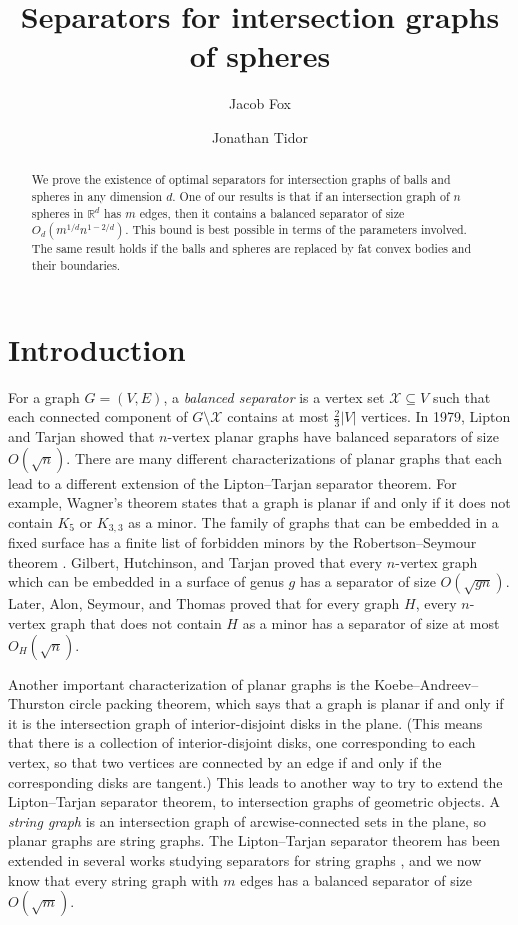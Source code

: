 \documentclass[11pt, reqno]{amsart}
\title{Separators for intersection graphs of spheres}
\author{Jacob Fox}
\author{Jonathan Tidor}
\date{}
\theoremstyle{plain}
\theoremstyle{definition}
\theoremstyle{remark}
\numberwithin{theorem}{section}
\numberwithin{equation}{section}
\newcommand{\R}{\mathbb R}
\newcommand{\fX}{\mathcal X}
\begin{document}
\begin{abstract}
We prove the existence of optimal separators for intersection graphs of balls and spheres in any dimension $d$. One of our results is that if an intersection graph of $n$ spheres in $\R^d$ has $m$ edges, then it contains a balanced separator of size $O_d(m^{1/d}n^{1-2/d})$. This bound is best possible in terms of the parameters involved. The same result holds if the balls and spheres are replaced by fat convex bodies and their boundaries.
\end{abstract}

\maketitle

\section{Introduction}
\label{sec:into}
For a graph $G=(V,E)$, a \emph{balanced separator} is a vertex set $\fX\subseteq V$ such that each connected component of $G\setminus \fX$ contains at most $\tfrac23|V|$ vertices. In 1979, Lipton and Tarjan \cite{LT79} showed that $n$-vertex planar graphs have balanced separators of size $O(\sqrt n)$. There are many different characterizations of planar graphs that each lead to a different extension of the Lipton--Tarjan separator theorem. For example, Wagner's theorem \cite{Wa37} states that a graph is planar if and only if it does not contain $K_5$ or $K_{3,3}$ as a minor. The family of graphs that can be embedded in a fixed surface has a finite list of forbidden minors by the Robertson--Seymour theorem \cite{RS04}. Gilbert, Hutchinson, and Tarjan \cite{GHT84} proved that every $n$-vertex graph which can be embedded in a surface of genus $g$ has a separator of size $O(\sqrt{gn})$. Later, Alon, Seymour, and Thomas \cite{AST90} proved that for every graph $H$, every $n$-vertex graph that does not contain $H$ as a minor has a separator of size at most $O_H(\sqrt{n})$. 

Another important characterization of planar graphs is the Koebe--Andreev--Thurston circle packing theorem, which says that a graph is planar if and only if it is the intersection graph of interior-disjoint disks in the plane. (This means that there is a collection of interior-disjoint disks, one corresponding to each vertex, so that two vertices are connected by an edge if and only if the corresponding disks are tangent.) This leads to another way to try to extend the Lipton--Tarjan separator theorem, to intersection graphs of geometric objects. A \emph{string graph} is an intersection graph of arcwise-connected sets in the plane, so planar graphs are string graphs. The Lipton--Tarjan separator theorem has been extended in several works studying separators for string graphs \cite{FP08,FP10,KoLo24,Lee17,Mat14}, and we now know that every string graph with $m$ edges has a balanced separator of size $O(\sqrt m)$. 
\end{document}

